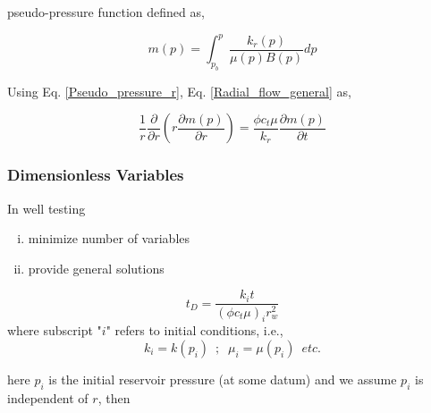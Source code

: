 \documentclass{llncs}
\numberwithin{equation}{section}
\numberwithin{figure}{section}
\numberwithin{table}{section}
\begin{document}
     pseudo-pressure function defined as,
    
    \begin{equation}
        m\left( p \right)=\int_{{{p}_{b}}}^{p}{\frac{{{k}_{r}}\left( p \right)}{\mu \left( p \right)B\left( p \right)}dp}
        \label{Pseudo_pressure_r}
    \end{equation}     
    
    Using Eq. \ref{Pseudo_pressure_r},  Eq. \ref{Radial_flow_general}  as,
    
    \begin{equation}
        \frac{1}{r}\frac{\partial }{\partial r}\left( r\frac{\partial m\left( p \right)}{\partial r} \right)=\frac{\phi {{c}_{t}}\mu }{{{k}_{r}}}\frac{\partial m\left( p \right)}{\partial t}
        \label{Radial_flow_Pseudo_pressure}
    \end{equation}     
    
    \subsubsection{Dimensionless Variables} 
    In well testing 
    \begin{enumerate}[(i)]
        \item minimize number of variables 
        \item provide general solutions
    \end{enumerate}    
    
    \begin{equation}
        {{t}_{D}}=\frac{{{k}_{i}}t}{{{\left( \phi {{c}_{t}}\mu  \right)}_{i}}r_{w}^{2}}
        \label{Dimensionless_time}
    \end{equation}        
    where subscript "$i$" refers to initial conditions, i.e.,
    \begin{equation*}
        k_{i} = k(p_{i})\,\,\,;\,\,\ \mu_{i}=\mu(p_{i})\,\,\,etc.
    \end{equation*}     
    
    here $p_{i}$ is the initial reservoir pressure (at some datum) and we assume $p_{i}$ is independent of $r$, then
    
\end{document}
